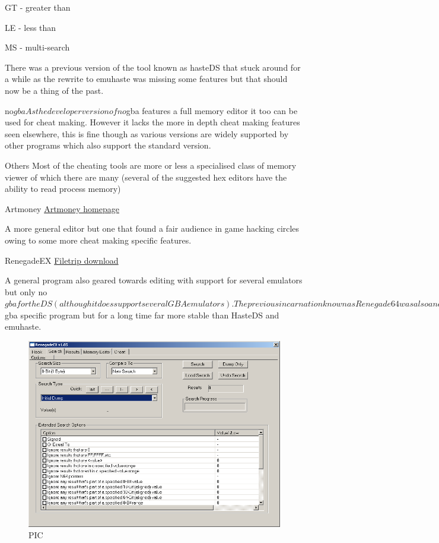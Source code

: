 \documentclass[
]{book}
\begin{document}
GT - greater than

LE - less than

MS - multi-search

There was a previous version of the tool known as hasteDS that stuck around for a while as the rewrite to emuhaste was missing some features but that should now be a thing of the past.

no\(gba As the developer version of no\)gba features a full memory editor it too can be used for cheat making. However it lacks the more in depth cheat making features seen elsewhere, this is fine though as various versions are widely supported by other programs which also support the standard version.

Others Most of the cheating tools are more or less a specialised class of memory viewer of which there are many (several of the suggested hex editors have the ability to read process memory)

Artmoney \href{http://www.artmoney.ru/}{Artmoney homepage}

A more general editor but one that found a fair audience in game hacking circles owing to some more cheat making specific features.

RenegadeEX \href{http://filetrip.net/pc-downloads/applications/download-renegadeex-105-f29011.html}{Filetrip download}

A general program also geared towards editing with support for several emulators but only no\(gba for the DS (although it does support several GBA emulators). The previous incarnation known as Renegade64 was also a no\)gba specific program but for a long time far more stable than HasteDS and emuhaste.

\begin{figure}
\centering
\includegraphics{images/200_home_fast6191_romhackingguide_unrenamed_fil___al_borders_romhackingguidecheatsrenegadeEX1.png}
\caption{PIC}
\end{figure}
\end{document}
